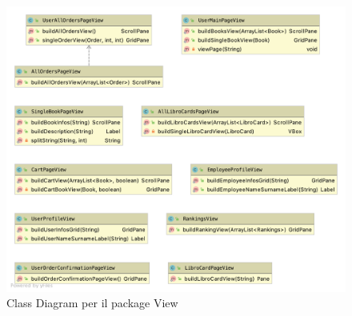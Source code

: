 \documentclass[12pt,a4paper]{article}
\begin{document}
	\begin{figure}[h!]
		\centering
		\includegraphics[scale=0.2]{images/ClassDiagrams/ViewClassDiagram.png}
		\caption{Class Diagram per il package View}
	\end{figure}
	\newpage
\end{document}
